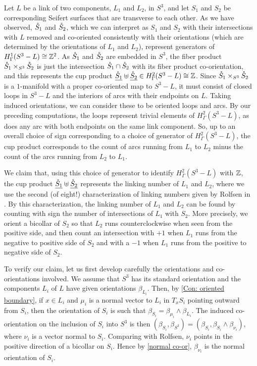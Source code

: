 Let $L$ be a link of two components, $L_1$ and $L_2$, in $S^3$, and let $S_1$ and $S_2$ be corresponding Seifert surfaces that are transverse to each other.
As we have observed, $\mathring{S}_1$ and $\mathring{S}_2$, which we can interpret as $S_1$ and $S_2$ with their intersections with $L$ removed and co-oriented consistently with their orientations (which are determined by the orientations of $L_1$ and $L_2$), represent generators of $H^1_\Gamma(S^3-L) \cong \mathbb{Z}^2$.
As $\mathring{S}_1$ and $\mathring{S}_2$ are embedded in $S^3$, the fiber product $\mathring{S}_1 \times_{S^3} \mathring{S}_2$ is just the intersection $\mathring{S}_1 \cap \mathring{S}_2$ with its fiber product co-orientation, and this represents the cup product $\underline{\mathring{S}_1} \uplus \underline{\mathring{S}_2} \in H^2_\Gamma(S^3-L) \cong \mathbb{Z}$.
Since $\mathring{S}_1 \times_{S^3} \mathring{S}_2$ is a $1$-manifold with a proper co-oriented map to $S^3-L$, it must consist of closed loops in $S^3-L$ and the interiors of arcs with their endpoints on $L$.
Taking induced orientations, we can consider these to be oriented loops and arcs.
By our preceding computations, the loops represent trivial elements of $H^2_\Gamma(S^3-L)$, as does any arc with both endpoints on the same link component.
So, up to an overall choice of sign corresponding to a choice of generator of $H^2_\Gamma(S^3-L)$, the cup product corresponds to the count of arcs running from $L_1$ to $L_2$ minus the count of the arcs running from $L_2$ to $L_1$.

We claim that, using this choice of generator to identify $H^2_\Gamma(S^3-L)$ with $\mathbb{Z}$, the cup product $\underline{\mathring{S}_1} \uplus \underline{\mathring{S}_2}$ represents the linking number of $L_1$ and $L_2$, where we use the second (of eight!) characterization of linking numbers given by Rolfsen in \cite[Section 5D]{Ro90}.
By this characterization, the linking number of $L_1$ and $L_2$ can be found by counting with sign the number of intersections of $L_1$ with $S_2$.
More precisely, we orient a bicollar of $S_2$ so that $L_2$ runs counterclockwise when seen from the positive side, and then count an intersection with $+1$ when $L_1$ runs from the negative to positive side of $S_2$ and with a $-1$ when $L_1$ runs from the positive to negative side of $S_2$.

To verify our claim, let us first develop carefully the orientations and co-orientations involved.
We assume that $S^3$ has its standard orientation and the components $L_i$ of $L$ have given orientations $\beta_{L_i}$.
Then, by \cref{Con: oriented boundary}, if $x \in L_i$ and $\mu_i$ is a normal vector to $L_i$ in $T_xS_i$ pointing outward from $S_i$, then the orientation of $S_i$ is such that $\beta_{S_i} = \beta_{\mu_i} \wedge \beta_{L_i}$.
The induced co-orientation on the inclusion of $S_i$ into $S^3$ is then $(\beta_{S_i}, \beta_{S^3}) = (\beta_{S_i}, \beta_{S_i} \wedge \beta_{\nu_i})$, where $\nu_i$ is a vector normal to $S_i$.
Comparing with Rolfsen, $\nu_i$ points in the positive direction of a bicollar on $S_i$.
Hence by \cref{normal co-or}, $\beta_{\nu_i}$ is the normal orientation of $S_i$.

